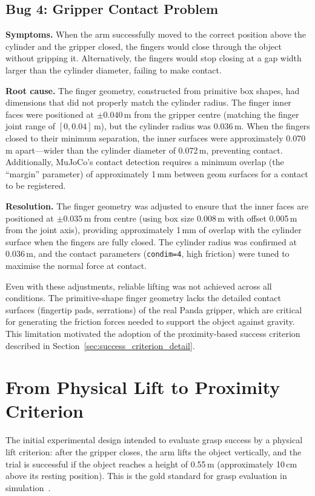 \documentclass[11pt,a4paper]{report}
\begin{document}
\subsection{Bug 4: Gripper Contact Problem}
\label{sec:bug_gripper}

\textbf{Symptoms.} When the arm successfully moved to the correct position above the cylinder and the gripper closed, the fingers would close through the object without gripping it. Alternatively, the fingers would stop closing at a gap width larger than the cylinder diameter, failing to make contact.

\textbf{Root cause.} The finger geometry, constructed from primitive box shapes, had dimensions that did not properly match the cylinder radius. The finger inner faces were positioned at $\pm 0.040$\,m from the gripper centre (matching the finger joint range of $[0, 0.04]$\,m), but the cylinder radius was 0.036\,m. When the fingers closed to their minimum separation, the inner surfaces were approximately 0.070\,m apart---wider than the cylinder diameter of 0.072\,m, preventing contact. Additionally, MuJoCo's contact detection requires a minimum overlap (the ``margin'' parameter) of approximately 1\,mm between geom surfaces for a contact to be registered.

\textbf{Resolution.} The finger geometry was adjusted to ensure that the inner faces are positioned at $\pm 0.035$\,m from centre (using box size 0.008\,m with offset 0.005\,m from the joint axis), providing approximately 1\,mm of overlap with the cylinder surface when the fingers are fully closed. The cylinder radius was confirmed at 0.036\,m, and the contact parameters (\texttt{condim=4}, high friction) were tuned to maximise the normal force at contact.

Even with these adjustments, reliable lifting was not achieved across all conditions. The primitive-shape finger geometry lacks the detailed contact surfaces (fingertip pads, serrations) of the real Panda gripper, which are critical for generating the friction forces needed to support the object against gravity. This limitation motivated the adoption of the proximity-based success criterion described in Section~\ref{sec:success_criterion_detail}.

\section{From Physical Lift to Proximity Criterion}
\label{sec:lift_to_proximity}

The initial experimental design intended to evaluate grasp success by a physical lift criterion: after the gripper closes, the arm lifts the object vertically, and the trial is successful if the object reaches a height of 0.55\,m (approximately 10\,cm above its resting position). This is the gold standard for grasp evaluation in simulation~\cite{fang2020graspnet}.
\end{document}
